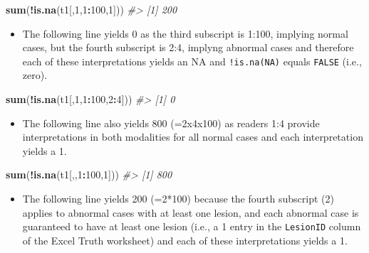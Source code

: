 \documentclass[]{book}
\newenvironment{Shaded}{\begin{snugshade}}{\end{snugshade}}
\newcommand{\CommentTok}[1]{\textcolor[rgb]{0.56,0.35,0.01}{\textit{#1}}}
\newcommand{\DecValTok}[1]{\textcolor[rgb]{0.00,0.00,0.81}{#1}}
\newcommand{\KeywordTok}[1]{\textcolor[rgb]{0.13,0.29,0.53}{\textbf{#1}}}
\newcommand{\NormalTok}[1]{#1}
\newcommand{\OperatorTok}[1]{\textcolor[rgb]{0.81,0.36,0.00}{\textbf{#1}}}
\providecommand{\tightlist}{%
  \setlength{\itemsep}{0pt}\setlength{\parskip}{0pt}}
\begin{document}
\begin{Shaded}
\begin{Highlighting}[]
\KeywordTok{sum}\NormalTok{(}\OperatorTok{!}\KeywordTok{is.na}\NormalTok{(t1[,}\DecValTok{1}\NormalTok{,}\DecValTok{1}\OperatorTok{:}\DecValTok{100}\NormalTok{,}\DecValTok{1}\NormalTok{]))}
\CommentTok{#> [1] 200}
\end{Highlighting}
\end{Shaded}

\begin{itemize}
\tightlist
\item
  The following line yields 0 as the third subscript is 1:100, implying normal cases, but the fourth subscript is 2:4, implyng abnormal cases and therefore each of these interpretations yields an NA and \texttt{!is.na(NA)} equals \texttt{FALSE} (i.e., zero).
\end{itemize}

\begin{Shaded}
\begin{Highlighting}[]
\KeywordTok{sum}\NormalTok{(}\OperatorTok{!}\KeywordTok{is.na}\NormalTok{(t1[,}\DecValTok{1}\NormalTok{,}\DecValTok{1}\OperatorTok{:}\DecValTok{100}\NormalTok{,}\DecValTok{2}\OperatorTok{:}\DecValTok{4}\NormalTok{]))}
\CommentTok{#> [1] 0}
\end{Highlighting}
\end{Shaded}

\begin{itemize}
\tightlist
\item
  The following line also yields 800 (=2x4x100) as readers 1:4 provide interpretations in both modalities for all normal cases and each interpretation yields a 1.
\end{itemize}

\begin{Shaded}
\begin{Highlighting}[]
\KeywordTok{sum}\NormalTok{(}\OperatorTok{!}\KeywordTok{is.na}\NormalTok{(t1[,,}\DecValTok{1}\OperatorTok{:}\DecValTok{100}\NormalTok{,}\DecValTok{1}\NormalTok{]))}
\CommentTok{#> [1] 800}
\end{Highlighting}
\end{Shaded}

\begin{itemize}
\tightlist
\item
  The following line yields 200 (=2*100) because the fourth subscript (2) applies to abnormal cases with at least one lesion, and each abnormal case is guaranteed to have at least one lesion (i.e., a 1 entry in the \texttt{LesionID} column of the Excel Truth worksheet) and each of these interpretations yields a 1.
\end{itemize}
\end{document}
